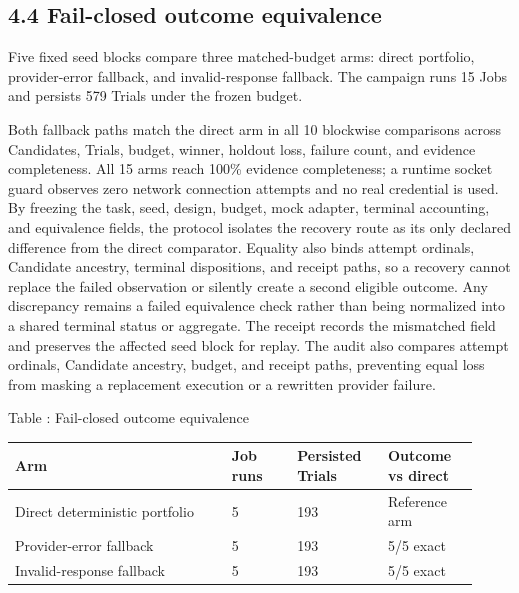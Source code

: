 \subsection{\texorpdfstring{\textbf{4.4 Fail-closed outcome
equivalence}}{4.4 Fail-closed outcome equivalence}}\label{fail-closed-outcome-equivalence}

Five fixed seed blocks compare three matched-budget arms: direct
portfolio, provider-error fallback, and invalid-response fallback. The
campaign runs 15 Jobs and persists 579 Trials under the frozen budget.

Both fallback paths match
the direct arm in all 10 blockwise comparisons across Candidates,
Trials, budget, winner, holdout loss, failure count, and evidence
completeness. All 15 arms reach 100\% evidence completeness; a runtime
socket guard observes zero network connection attempts and no real
credential is used. By freezing the task, seed, design, budget, mock
adapter, terminal accounting, and equivalence fields, the protocol
isolates the recovery route as its only declared difference from the
direct comparator. Equality also binds attempt ordinals, Candidate
ancestry, terminal dispositions, and receipt paths, so a recovery cannot
replace the failed observation or silently create a second eligible
outcome. Any discrepancy remains a failed equivalence check rather than
being normalized into a shared terminal status or aggregate. The receipt
records the mismatched field and preserves the affected seed block for
replay. The audit also compares attempt ordinals, Candidate ancestry, budget,
and receipt paths, preventing equal loss from masking a replacement execution
or a rewritten provider failure.

\begingroup
\centering
{}\textnormal{Table \thetable: Fail-closed outcome equivalence}\par
\vspace{0.20em}
\begin{tabular}{@{}L{0.43\linewidth}C{0.13\linewidth}C{0.18\linewidth}L{0.18\linewidth}@{}}
\toprule
\textbf{Arm} & \textbf{Job runs} & \textbf{Persisted Trials} &
\textbf{Outcome vs direct}\tabularnewline
\midrule
Direct deterministic portfolio & 5 & 193 & Reference arm\tabularnewline
Provider-error fallback & 5 & 193 & 5/5 exact\tabularnewline
Invalid-response fallback & 5 & 193 & 5/5 exact\tabularnewline
\bottomrule
\end{tabular}\par
\endgroup


